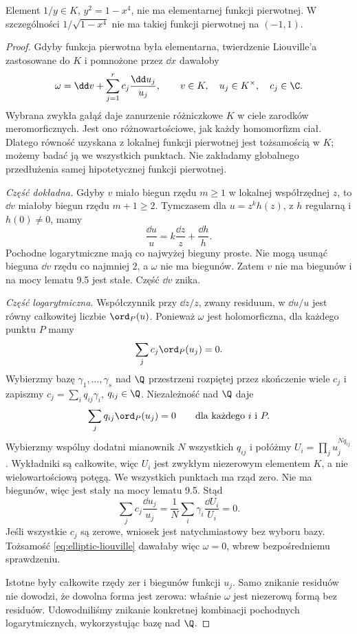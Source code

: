 \begin{twierdzenie}
Element $1/y\in K$, $y^2=1-x^4$, nie ma elementarnej funkcji pierwotnej. W szczególności $1/\sqrt{1-x^4}$ nie ma takiej funkcji pierwotnej na $(-1,1)$.
\end{twierdzenie}
\begin{proof}
Gdyby funkcja pierwotna była elementarna, twierdzenie Liouville'a zastosowane do $K$ i pomnożone przez $\dd x$ dawałoby
\begin{equation}\label{eq:elliptic-liouville}
\omega=\dd v+\sum_{j=1}^r c_j\frac{\dd u_j}{u_j},\qquad
v\in K,\quad u_j\in K^\times,\quad c_j\in\C.
\end{equation}
Wybrana zwykła gałąź daje zanurzenie różniczkowe $K$ w ciele zarodków meromorficznych. Jest ono różnowartościowe, jak każdy homomorfizm ciał. Dlatego równość uzyskana z lokalnej funkcji pierwotnej jest tożsamością w $K$; możemy badać ją we wszystkich punktach. Nie zakładamy globalnego przedłużenia samej hipotetycznej funkcji pierwotnej.

\emph{Część dokładna.} Gdyby $v$ miało biegun rzędu $m\ge1$ w lokalnej współrzędnej $z$, to $\dd v$ miałoby biegun rzędu $m+1\ge2$. Tymczasem dla $u=z^k h(z)$, z $h$ regularną i $h(0)\ne0$, mamy
\[
\frac{\dd u}{u}=k\frac{\dd z}{z}+\frac{\dd h}{h}.
\]
Pochodne logarytmiczne mają co najwyżej bieguny proste. Nie mogą usunąć bieguna $\dd v$ rzędu co najmniej $2$, a $\omega$ nie ma biegunów. Zatem $v$ nie ma biegunów i na mocy lematu 9.5 jest stałe. Część $\dd v$ znika.

\emph{Część logarytmiczna.} Współczynnik przy $\dd z/z$, zwany residuum, w $\dd u/u$ jest równy całkowitej liczbie $\ord_P(u)$. Ponieważ $\omega$ jest holomorficzna, dla każdego punktu $P$ mamy
\[
\sum_j c_j\ord_P(u_j)=0.
\]
Wybierzmy bazę $\gamma_1,\dots,\gamma_s$ nad $\Q$ przestrzeni rozpiętej przez skończenie wiele $c_j$ i zapiszmy $c_j=\sum_i q_{ij}\gamma_i$, $q_{ij}\in\Q$. Niezależność nad $\Q$ daje
\[
\sum_j q_{ij}\ord_P(u_j)=0\qquad\text{dla każdego }i\text{ i }P.
\]
Wybierzmy wspólny dodatni mianownik $N$ wszystkich $q_{ij}$ i połóżmy $U_i=\prod_j u_j^{Nq_{ij}}$. Wykładniki są całkowite, więc $U_i$ jest zwykłym niezerowym elementem $K$, a nie wielowartościową potęgą. We wszystkich punktach ma rząd zero. Nie ma biegunów, więc jest stały na mocy lematu 9.5. Stąd
\[
\sum_j c_j\frac{\dd u_j}{u_j}
=\frac1N\sum_i\gamma_i\frac{\dd U_i}{U_i}=0.
\]
Jeśli wszystkie $c_j$ są zerowe, wniosek jest natychmiastowy bez wyboru bazy. Tożsamość \eqref{eq:elliptic-liouville} dawałaby więc $\omega=0$, wbrew bezpośredniemu sprawdzeniu.

Istotne były całkowite rzędy zer i biegunów funkcji $u_j$. Samo znikanie residuów nie dowodzi, że dowolna forma jest zerowa: właśnie $\omega$ jest niezerową formą bez residuów. Udowodniliśmy znikanie konkretnej kombinacji pochodnych logarytmicznych, wykorzystując bazę nad $\Q$.
\end{proof}

